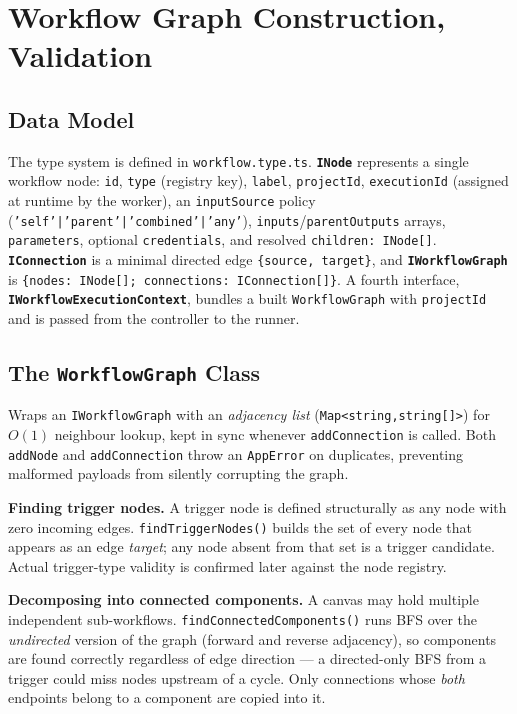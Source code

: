 \section{Workflow Graph Construction, Validation}

\subsection{Data Model}

The type system is defined in \texttt{workflow.type.ts}. \textbf{\texttt{INode}}
represents a single workflow node: \texttt{id}, \texttt{type} (registry key),
\texttt{label}, \texttt{projectId}, \texttt{executionId} (assigned at runtime
by the worker), an \texttt{inputSource} policy
(\texttt{'self'|'parent'|'combined'|'any'}), \texttt{inputs}/\texttt{parentOutputs}
arrays, \texttt{parameters}, optional \texttt{credentials}, and resolved
\texttt{children: INode[]}. \textbf{\texttt{IConnection}} is a minimal directed
edge \texttt{\{source, target\}}, and \textbf{\texttt{IWorkflowGraph}} is
\texttt{\{nodes: INode[]; connections: IConnection[]\}}. A fourth interface,\\
\textbf{\texttt{IWorkflowExecutionContext}}, bundles a built
\texttt{WorkflowGraph} with \texttt{projectId} and is passed from the
controller to the runner.

\subsection{The \texttt{WorkflowGraph} Class}

Wraps an \texttt{IWorkflowGraph} with an \textit{adjacency list}
(\texttt{Map<string,string[]>}) for $O(1)$ neighbour lookup, kept in sync
whenever \texttt{addConnection} is called. Both \texttt{addNode} and
\texttt{addConnection} throw an \texttt{AppError} on duplicates, preventing
malformed payloads from silently corrupting the graph.

\textbf{Finding trigger nodes.} A trigger node is defined structurally as any
node with zero incoming edges. \texttt{findTriggerNodes()} builds the set of
every node that appears as an edge \textit{target}; any node absent from that
set is a trigger candidate. Actual trigger-type validity is confirmed later
against the node registry.

\textbf{Decomposing into connected components.} A canvas may hold multiple
independent sub-workflows. \texttt{findConnectedComponents()} runs BFS over
the \textit{undirected} version of the graph (forward and reverse adjacency),
so components are found correctly regardless of edge direction --- a
directed-only BFS from a trigger could miss nodes upstream of a cycle. Only
connections whose \textit{both} endpoints belong to a component are copied
into it.

